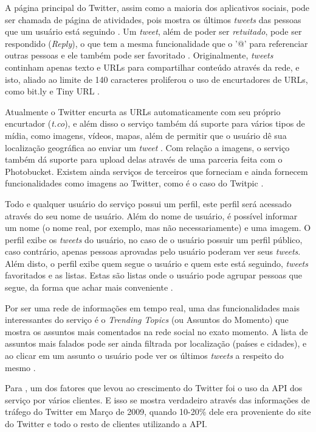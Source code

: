\documentclass[diss]{template/setrem}
\begin{document}
A página principal do Twitter, assim como a maioria dos aplicativos sociais, pode ser chamada de página de atividades, pois mostra os últimos \emph{tweets} das pessoas que um usuário está seguindo \citep{Bell2009}. Um \emph{tweet}, além de poder ser \emph{retuitado}, pode ser respondido (\emph{Reply}), o que tem a mesma funcionalidade que o '@' para referenciar outras pessoas e ele também pode ser favoritado \citep{Kwak2010}. Originalmente, \emph{tweets} continham apenas texto e URLs para compartilhar conteúdo através da rede, e isto, aliado ao limite de 140 caracteres proliferou o uso de encurtadores de URLs, como bit.ly e Tiny URL \citep{Rowinski2011}.

Atualmente o Twitter encurta as URLs automaticamente com seu próprio encurtador (\emph{t.co}), e além disso o serviço também dá suporte para vários tipos de mídia, como imagens, vídeos, mapas, além de permitir que o usuário dê sua localização geográfica ao enviar um \emph{tweet} \citep{Rowinski2011, Twitter2012a}. Com relação a imagens, o serviço também dá suporte para upload delas através de uma parceria feita com o Photobucket. Existem ainda serviços de terceiros que forneciam e ainda fornecem funcionalidades como imagens ao Twitter, como é o caso do Twitpic \citep{Panzarino2011}.

Todo e qualquer usuário do serviço possui um perfil, este perfil será acessado através do seu nome de usuário. Além do nome de usuário, é possível informar um nome (o nome real, por exemplo, mas não necessariamente) e uma imagem. O perfil exibe os \emph{tweets} do usuário, no caso de o usuário possuir um perfil público, caso contrário, apenas pessoas aprovadas pelo usuário poderam ver seus \emph{tweets}. Além disto, o perfil exibe quem segue o usuário e quem este está seguindo, \emph{tweets} favoritados e as listas. Estas são listas onde o usuário pode agrupar pessoas que segue, da forma que achar mais conveniente \citep{Twitter2012a}.

Por ser uma rede de informações em tempo real, uma das funcionalidades mais interessantes do serviço é o \emph{Trending Topics} (ou Assuntos do Momento) que mostra os assuntos mais comentados na rede social no exato momento. A lista de assuntos mais falados pode ser ainda filtrada por localização (países e cidades), e ao clicar em um assunto o usuário pode ver os últimos \emph{tweets} a respeito do mesmo \citep{Twitter2012a}.

Para \citet{Bell2009}, um dos fatores que levou ao crescimento do Twitter foi o uso da API dos serviço por vários clientes. E isso se mostra verdadeiro através das informações de tráfego do Twitter em Março de 2009, quando 10-20\% dele era proveniente do site do Twitter e todo o resto de clientes utilizando a API.
\end{document}
